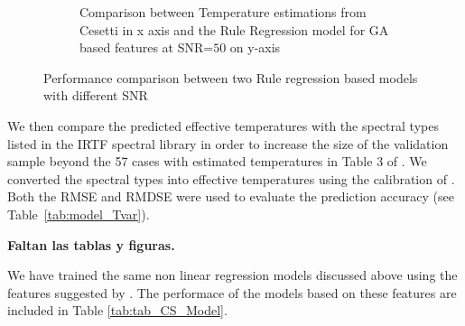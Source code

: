 \begin {figure}
\begin{subfigure}{.85\textwidth}
  \caption{Comparison between Temperature estimations from Cesetti 
 in x axis and the Rule Regression model for GA based features 
 at SNR=$50$ on y-axis}
 \label{fig:ga_rr50ga_spt}
 \end{subfigure} 
 \label {fig:comp02}
 \caption{Performance comparison between two Rule regression based models with different SNR}
\end {figure}


We then compare the predicted effective temperatures with the spectral
types listed in the IRTF spectral library in order to increase the
size of the validation sample beyond the 57 cases with estimated
temperatures in Table 3 of \cite{cesetti}. We converted the spectral
types into effective temperatures using the calibration of
\cite{2009ApJ...702..154S}. Both the RMSE and RMDSE were used to
evaluate the prediction accuracy (see Table~\ref{tab:model_Tvar}).

{\bf Faltan las tablas y figuras.}




We have trained the same non linear regression models discussed above
using the features suggested by \cite{cesetti}. The performace of the
models based on these features are included in Table
\ref{tab:tab_CS_Model}.

